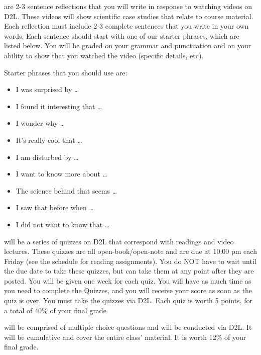 \documentclass{tufte-handout}
\begin{document}
\begin{fullwidth}

 are 2-3 sentence reflections that you will write in response to watching videos on D2L. These videos will show scientific case studies that relate to course material. Each reflection must include 2-3 complete sentences that you write in your own words. Each sentence should start with one of our starter phrases, which are listed below. You will be graded on your grammar and punctuation and on your ability to show that you watched the video (specific details, etc).

Starter phrases that you should use are:

\begin{itemize}
\setlength{\parskip}{0pt} \setlength{\itemsep}{0pt plus 1pt}
	\item I was surprised by \ldots
 	\item I found it interesting that \ldots
	\item I wonder why \ldots
	\item It's really cool that \ldots
	\item I am disturbed by \ldots
	\item I want to know more about \ldots
	\item The science behind that seems \ldots
	\item I saw that before when \ldots
	\item I did not want to know that \ldots
\end{itemize}




 will be a series of quizzes on D2L that correspond with readings and video lectures.  These quizzes are all open-book/open-note and are due at 10:00 pm each Friday (see the schedule for reading assignments). You do NOT have to wait until the due date to take these quizzes, but can take them at any point after they are posted. You will be given one week for each quiz. You will have as much time as you need to complete the Quizzes, and you will receive your score as soon as the quiz is over. You must take the quizzes via D2L. Each quiz is worth 5 points, for a total of 40\% of your final grade.




 will be comprised of multiple choice questions and will be conducted via D2L. It will be cumulative and cover the entire class' material. It is worth 12\% of your final grade.






\end{fullwidth}
\end{document}
